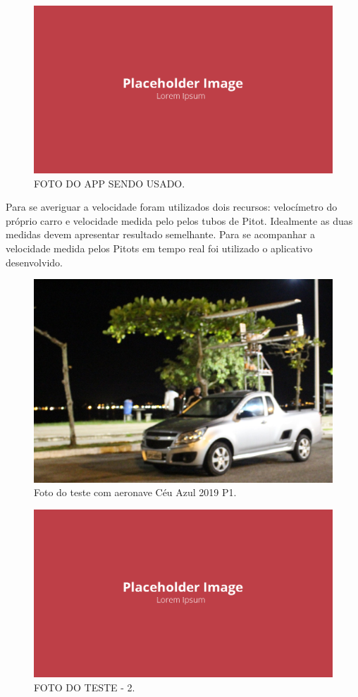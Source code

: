 \begin{figure}[!ht]
    \centering
    \includegraphics[width=.8\linewidth]{figuras/outras/placeholder.png}
    \caption{FOTO DO APP SENDO USADO\cite{autor}.}
    \label{fig:placeholder}
\end{figure}

Para se averiguar a velocidade foram utilizados dois recursos: velocímetro do próprio carro e velocidade medida pelo pelos tubos de Pitot. Idealmente as duas medidas devem apresentar resultado semelhante. Para se acompanhar a velocidade medida pelos Pitots em tempo real foi utilizado o aplicativo desenvolvido.

\begin{figure}[!ht]
    \centering
    \includegraphics[width=.8\linewidth]{figuras/testes/teste_aviao_completo.JPG}
    \caption{Foto do teste com aeronave Céu Azul 2019 P1\cite{autor}.}
    \label{fig:foto_teste_aviao}
\end{figure}

\begin{figure}[!ht]
    \centering
    \includegraphics[width=.8\linewidth]{figuras/outras/placeholder.png}
    \caption{FOTO DO TESTE - 2\cite{autor}.}
    \label{fig:placeholder}
\end{figure}


